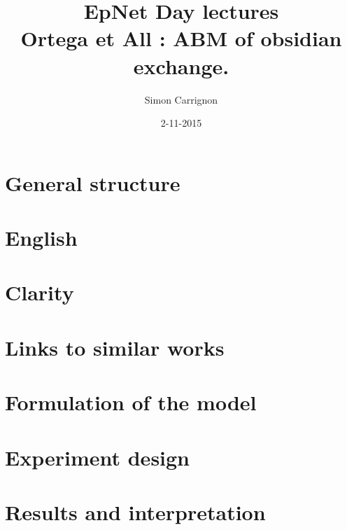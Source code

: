 \documentclass[a4paper]{article}
\title{EpNet Day lectures\\
Ortega et All : ABM of obsidian exchange.
}
\author{Simon Carrignon}
\date{2-11-2015}
\begin{document}
\maketitle

\section{General structure}
\section{English}
\section{Clarity}
\section{Links to similar works}
\section{Formulation of the model}
\section{Experiment design}
\section{Results and interpretation}


  
\end{document}

